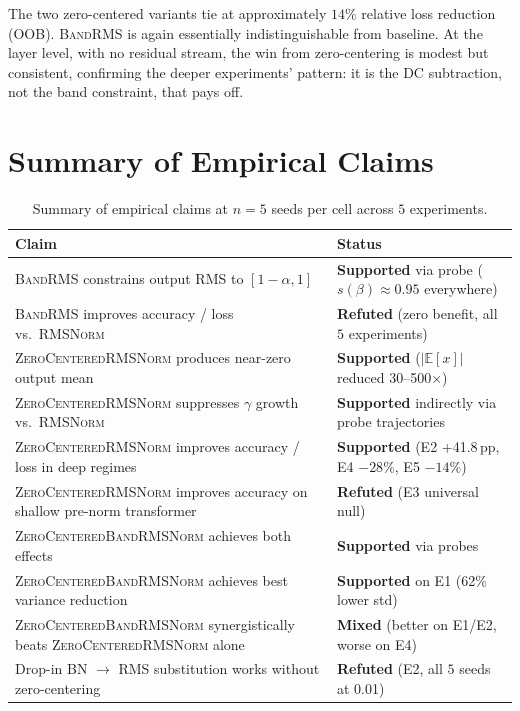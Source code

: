 \documentclass{article}
\newcommand{\E}{\mathbb{E}}
\newcommand{\rms}{\textsc{RMSNorm}}
\newcommand{\bandrms}{\textsc{BandRMS}}
\newcommand{\zcrms}{\textsc{ZeroCentered}\-\textsc{RMSNorm}}
\newcommand{\zcband}{\textsc{ZeroCentered}\-\textsc{BandRMSNorm}}
\begin{document}
The two zero-centered variants tie at approximately $14\%$ relative loss reduction (OOB).
\bandrms{} is again essentially indistinguishable from baseline.
At the layer level, with no residual stream, the win from zero-centering is modest but consistent, confirming the deeper experiments' pattern: it is the DC subtraction, not the band constraint, that pays off.

\section{Summary of Empirical Claims}
\label{sec:claims}

\begin{table}[H]
\centering
\caption{Summary of empirical claims at $n{=}5$ seeds per cell across $5$ experiments.}
\label{tab:claims}
\renewcommand{\arraystretch}{1.15}
\begin{tabular}{p{}p{}}
\toprule
\textbf{Claim} & \textbf{Status} \\
\midrule
\bandrms{} constrains output RMS to $[1-\alpha, 1]$           & \textcolor{passgreen}{\textbf{Supported}} via probe ($s(\beta) \approx 0.95$ everywhere) \\
\bandrms{} improves accuracy / loss vs.\ \rms{}                & \textcolor{failred}{\textbf{Refuted}} (zero benefit, all $5$ experiments) \\
\zcrms{} produces near-zero output mean                       & \textcolor{passgreen}{\textbf{Supported}} ($|\E[x]|$ reduced 30--500$\times$) \\
\zcrms{} suppresses $\gamma$ growth vs.\ \rms{}                & \textcolor{passgreen}{\textbf{Supported}} indirectly via probe trajectories \\
\zcrms{} improves accuracy / loss in deep regimes              & \textcolor{passgreen}{\textbf{Supported}} (E2 +41.8\,pp, E4 $-28\%$, E5 $-14\%$) \\
\zcrms{} improves accuracy on shallow pre-norm transformer     & \textcolor{failred}{\textbf{Refuted}} (E3 universal null) \\
\zcband{} achieves both effects                                & \textcolor{passgreen}{\textbf{Supported}} via probes \\
\zcband{} achieves best variance reduction                     & \textcolor{passgreen}{\textbf{Supported}} on E1 (62\% lower std) \\
\zcband{} synergistically beats \zcrms{} alone                 & \textcolor{red!75!black}{\textbf{Mixed}} (better on E1/E2, worse on E4) \\
Drop-in BN $\to$ RMS substitution works without zero-centering & \textcolor{failred}{\textbf{Refuted}} (E2, all $5$ seeds at 0.01) \\
\bottomrule
\end{tabular}
\end{table}
\end{document}
